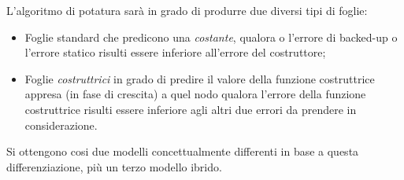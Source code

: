 L'algoritmo di potatura sarà in grado di produrre due diversi tipi di foglie: 
\begin{itemize}
	\item Foglie standard che predicono una \emph{costante}, qualora o l'errore di backed-up o l'errore statico risulti essere inferiore all'errore del costruttore;	
	\item Foglie \emph{costruttrici} in grado di predire il valore della funzione costruttrice appresa (in fase di crescita) a quel nodo qualora l'errore della funzione costruttrice risulti essere inferiore agli altri due errori da prendere in considerazione.
\end{itemize}
Si ottengono cosi due modelli concettualmente differenti in base a questa differenziazione, più un terzo modello ibrido.

